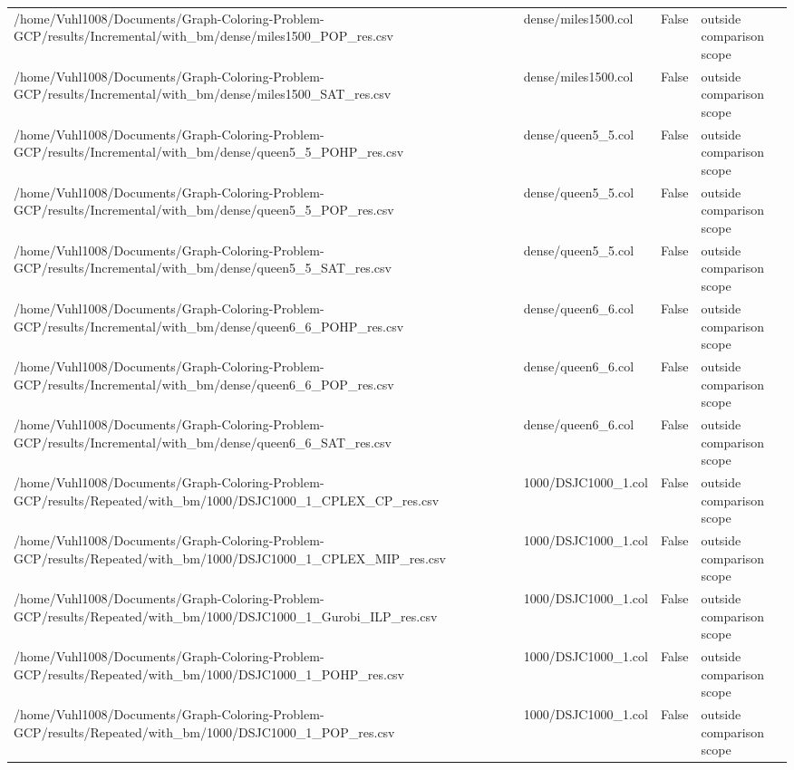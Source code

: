 \begin{table}[htbp]
\begin{tabular}{llll}
/home/Vuhl1008/Documents/Graph-Coloring-Problem-GCP/results/Incremental/with\_bm/dense/miles1500\_POP\_res.csv & dense/miles1500.col & False & outside comparison scope \\
/home/Vuhl1008/Documents/Graph-Coloring-Problem-GCP/results/Incremental/with\_bm/dense/miles1500\_SAT\_res.csv & dense/miles1500.col & False & outside comparison scope \\
/home/Vuhl1008/Documents/Graph-Coloring-Problem-GCP/results/Incremental/with\_bm/dense/queen5\_5\_POHP\_res.csv & dense/queen5\_5.col & False & outside comparison scope \\
/home/Vuhl1008/Documents/Graph-Coloring-Problem-GCP/results/Incremental/with\_bm/dense/queen5\_5\_POP\_res.csv & dense/queen5\_5.col & False & outside comparison scope \\
/home/Vuhl1008/Documents/Graph-Coloring-Problem-GCP/results/Incremental/with\_bm/dense/queen5\_5\_SAT\_res.csv & dense/queen5\_5.col & False & outside comparison scope \\
/home/Vuhl1008/Documents/Graph-Coloring-Problem-GCP/results/Incremental/with\_bm/dense/queen6\_6\_POHP\_res.csv & dense/queen6\_6.col & False & outside comparison scope \\
/home/Vuhl1008/Documents/Graph-Coloring-Problem-GCP/results/Incremental/with\_bm/dense/queen6\_6\_POP\_res.csv & dense/queen6\_6.col & False & outside comparison scope \\
/home/Vuhl1008/Documents/Graph-Coloring-Problem-GCP/results/Incremental/with\_bm/dense/queen6\_6\_SAT\_res.csv & dense/queen6\_6.col & False & outside comparison scope \\
/home/Vuhl1008/Documents/Graph-Coloring-Problem-GCP/results/Repeated/with\_bm/1000/DSJC1000\_1\_CPLEX\_CP\_res.csv & 1000/DSJC1000\_1.col & False & outside comparison scope \\
/home/Vuhl1008/Documents/Graph-Coloring-Problem-GCP/results/Repeated/with\_bm/1000/DSJC1000\_1\_CPLEX\_MIP\_res.csv & 1000/DSJC1000\_1.col & False & outside comparison scope \\
/home/Vuhl1008/Documents/Graph-Coloring-Problem-GCP/results/Repeated/with\_bm/1000/DSJC1000\_1\_Gurobi\_ILP\_res.csv & 1000/DSJC1000\_1.col & False & outside comparison scope \\
/home/Vuhl1008/Documents/Graph-Coloring-Problem-GCP/results/Repeated/with\_bm/1000/DSJC1000\_1\_POHP\_res.csv & 1000/DSJC1000\_1.col & False & outside comparison scope \\
/home/Vuhl1008/Documents/Graph-Coloring-Problem-GCP/results/Repeated/with\_bm/1000/DSJC1000\_1\_POP\_res.csv & 1000/DSJC1000\_1.col & False & outside comparison scope \\

\end{tabular}
\end{table}
